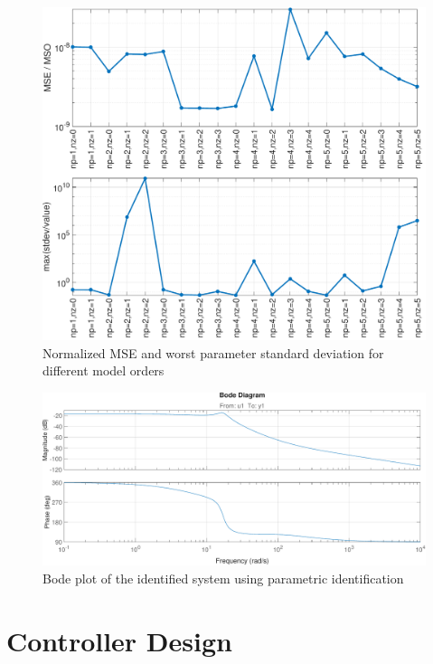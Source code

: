 \documentclass[11pt]{article}
\begin{document}
\begin{figure}[!ht]
\centering
\includegraphics[width=\textwidth]{sysid-errors-fig.pdf}
\caption{Normalized MSE and worst parameter standard deviation for different model orders}
\label{fig:errors-param}
\end{figure}


\begin{figure}[!ht]
\centering
\includegraphics[width=\textwidth]{bodeid-param.pdf}
\caption{Bode plot of the identified system using parametric identification}
\label{fig:bodeid_param}
\end{figure}

\clearpage
\section{Controller Design}
\label{sec:control}
\end{document}
